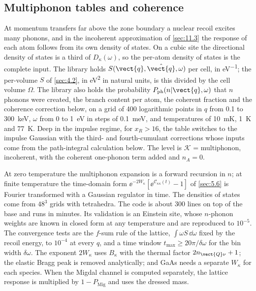\subsection{Multiphonon tables and coherence}

At momentum transfers far above the zone boundary a nuclear recoil excites many phonons, and in the incoherent approximation of \cref{sec:11.3} the response of each atom follows from its own density of states. On a cubic site the directional density of states is a third of $D_\kappa(\omega)$, so the per-atom density of states is the complete input. The library holds $S(\vect{q},\hat{\vect{q}},\omega)$ per cell, in \si{eV^{-1}}; the per-volume $S$ of \cref{sec:4.2}, in \si{eV^2} in natural units, is this divided by the cell volume $\Omega$. The library also holds the probability $P_{\mathrm{ph}}(n|\vect{q},\omega)$ that $n$ phonons were created, the branch content per atom, the coherent fraction and the coherence correction below, on a grid of 400 logarithmic points in $q$ from 0.1 to \SI{300}{keV}, $\omega$ from 0 to \SI{1}{eV} in steps of \SI{0.1}{meV}, and temperatures of \SI{10}{mK}, \SI{1}{K} and \SI{77}{K}. Deep in the impulse regime, for $x_R > 16$, the table switches to the impulse Gaussian with the third- and fourth-cumulant corrections whose inputs come from the path-integral calculation below. The level is $\mathcal{K}$ = multiphonon, incoherent, with the coherent one-phonon term added and $n_A = 0$.

At zero temperature the multiphonon expansion is a forward recursion in $n$; at finite temperature the time-domain form $\ee^{-2W_\kappa}[\ee^{\mathcal{C}_{\kappa\kappa}(t)} - 1]$ of \cref{sec:5.6} is Fourier transformed with a Gaussian regulator in time. The densities of states come from $48^3$ grids with tetrahedra. The code is about 300 lines on top of the base and runs in minutes. Its validation is an Einstein site, whose $n$-phonon weights are known in closed form at any temperature and are reproduced to $10^{-5}$. The convergence tests are the $f$-sum rule of the lattice, $\int\omega S\,\dd\omega$ fixed by the recoil energy, to $10^{-4}$ at every $q$, and a time window $t_{\mathrm{max}} \ge 20\pi/\delta\omega$ for the bin width $\delta\omega$. The exponent $2W_\kappa$ uses $B_\kappa$ with the thermal factor $2n_{\vect{Q}\nu} + 1$; the elastic Bragg peak is removed analytically; and GaAs needs a separate $W_\kappa$ for each species. When the Migdal channel is computed separately, the lattice response is multiplied by $1 - P_{\mathrm{Mig}}$ and uses the dressed mass.

